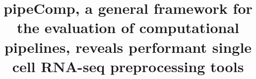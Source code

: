\documentclass{bmcart}
\begin{document}
\begin{frontmatter}

\begin{fmbox}


\title{pipeComp, a general framework for the evaluation of computational pipelines, reveals performant single cell RNA-seq preprocessing tools}


\author[
   addressref={aff1,aff2,aff3},          %
   email={pierre-luc.germain@hest.ethz.ch}   %
]{ }
\author[
   addressref={aff1,aff2},
    email={anthony.sonrel@uzh.ch}
]{ }
\author[
   addressref={aff1,aff2},
   corref={aff1},  %
   email={mark.robinson@imls.uzh.ch}
]{ }


\address[id=aff1]{
  , %
  ,
  ,
}
\address[id=aff2]{
  , %
  ,
}
\address[id=aff3]{
  ,
  ,
  ,
}


\end{fmbox}
\end{frontmatter}
\end{document}
